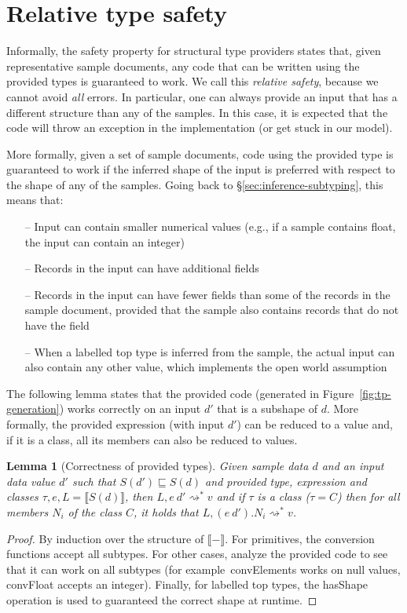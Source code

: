 \documentclass[10pt]{sigplanconf}
\newcommand{\kvd}[1]{\textnormal{\textcolor{kvdclr}{\sffamily #1}}}
\newcommand{\ident}[1]{\textnormal{\sffamily #1}}
\newcommand{\reduce}{\rightsquigarrow}
\newcommand{\sem}[1]{\llbracket #1 \rrbracket}
\newcommand{\semalt}[1]{S(#1)}
\newtheorem{lemma}[theorem]{Lemma}
\begin{document}
\section{Relative type safety}
\label{sec:safety}

Informally, the safety property for structural type providers states that, given representative sample
documents, any code that can be written using the provided types is guaranteed to work. We call this 
\emph{relative safety}, because we cannot avoid \emph{all} errors. In particular, one can always
provide an input that has a different structure than any of the samples. In this case, it is expected 
that the code will throw an exception in the implementation (or get stuck in our model).

More formally, given a set of sample documents, code using the provided type is guaranteed to work if 
the inferred shape of the input is preferred with respect to the shape of any of the samples. Going back to 
\S\ref{sec:inference-subtyping}, this means that:
%
\begin{itemize}
\item[--] Input can contain smaller numerical values (e.g., if a sample contains float, the input can contain an integer)
\item[--] Records in the input can have additional fields
\item[--] Records in the input can have fewer fields than some of the records in the sample 
  document, provided that the sample also contains records that do not have the field 
\item[--] When a labelled top type is inferred from the sample, the actual input can also contain any other value,
  which implements the open world assumption  
\end{itemize}
%
The following lemma states that the provided code (generated in Figure~\ref{fig:tp-generation})
works correctly on an input $d'$ that is a subshape of $d$. More formally, the provided
expression (with input $d'$) can be reduced to a value and, if it is a class,
all its members can also be reduced to values.

\begin{lemma}[Correctness of provided types]
\label{thm:tp-correctness}
Given sample data $d$ and an input data value $d'$ such that $\semalt{d'} \sqsubseteq \semalt{d}$
and provided type, expression and classes $\tau, e, L = \sem{\semalt{d}}$, 
then $L, e~d' \reduce^{*} v$ and if $\tau$ is a class ($\tau=C$) then for all members $N_i$ of the 
class $C$, it holds that $L, (e~d').N_i \reduce^{*} v$.
\end{lemma}
\begin{proof}
By induction over the structure of $\sem{-}$. For primitives, the conversion functions accept all subtypes.
For other cases, analyze the provided code to see that it can work on all subtypes (for example~\ident{convElements}
works on \kvd{null} values, \ident{convFloat} accepts an integer). Finally, for labelled top types,
the \ident{hasShape} operation is used to guaranteed the correct shape at runtime.
\end{proof}
\end{document}
